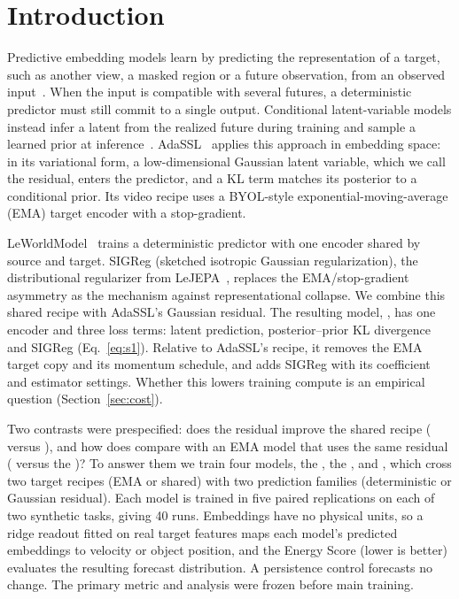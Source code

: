 \section{Introduction}
\label{sec:intro}

Predictive embedding models learn by predicting the representation of a target, such as another view, a masked region or a future observation, from an observed input~\citep{grill2020byol,assran2023ijepa,maes2026lewm}. When the input is compatible with several futures, a deterministic predictor must still commit to a single output. Conditional latent-variable models instead infer a latent from the realized future during training and sample a learned prior at inference~\citep{sohn2015cvae,denton2018svg}. AdaSSL~\citep{zhang2026adassl} applies this approach in embedding space: in its variational form, a low-dimensional Gaussian latent variable, which we call the residual, enters the predictor, and a KL term matches its posterior to a conditional prior. Its video recipe uses a BYOL-style exponential-moving-average (EMA) target encoder with a stop-gradient.

LeWorldModel~\citep{maes2026lewm} trains a deterministic predictor with one encoder shared by source and target. SIGReg (sketched isotropic Gaussian regularization), the distributional regularizer from LeJEPA~\citep{balestriero2025lejepa}, replaces the EMA/stop-gradient asymmetry as the mechanism against representational collapse. We combine this shared recipe with AdaSSL's Gaussian residual. The resulting model, \shvar{}, has one encoder and three loss terms: latent prediction, posterior--prior KL divergence and SIGReg (Eq.~\eqref{eq:s1}). Relative to AdaSSL's recipe, it removes the EMA target copy and its momentum schedule, and adds SIGReg with its coefficient and estimator settings. Whether this lowers training compute is an empirical question (Section~\ref{sec:cost}).

Two contrasts were prespecified: does the residual improve the shared recipe (\shvar{} versus \shdet{}), and how does \shvar{} compare with an EMA model that uses the same residual (\shvar{} versus the \emavar{})? To answer them we train four models, the \emadet{}, the \emavar{}, \shdet{} and \shvar{}, which cross two target recipes (EMA or shared) with two prediction families (deterministic or Gaussian residual). Each model is trained in five paired replications on each of two synthetic tasks, giving 40 runs. Embeddings have no physical units, so a ridge readout fitted on real target features maps each model's predicted embeddings to velocity or object position, and the Energy Score (lower is better) evaluates the resulting forecast distribution. A persistence control forecasts no change. The primary metric and analysis were frozen before main training.

